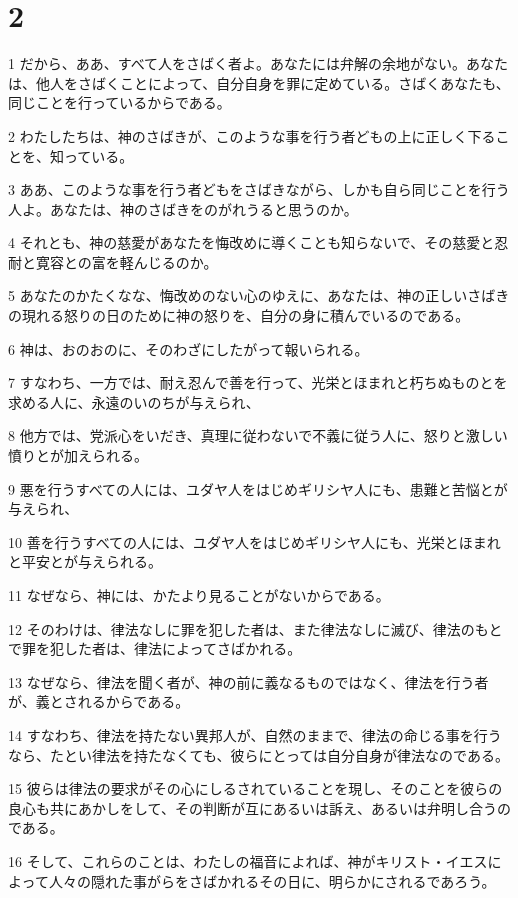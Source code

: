 \chapter{2}

\par 1 だから、ああ、すべて人をさばく者よ。あなたには弁解の余地がない。あなたは、他人をさばくことによって、自分自身を罪に定めている。さばくあなたも、同じことを行っているからである。
\par 2 わたしたちは、神のさばきが、このような事を行う者どもの上に正しく下ることを、知っている。
\par 3 ああ、このような事を行う者どもをさばきながら、しかも自ら同じことを行う人よ。あなたは、神のさばきをのがれうると思うのか。
\par 4 それとも、神の慈愛があなたを悔改めに導くことも知らないで、その慈愛と忍耐と寛容との富を軽んじるのか。
\par 5 あなたのかたくなな、悔改めのない心のゆえに、あなたは、神の正しいさばきの現れる怒りの日のために神の怒りを、自分の身に積んでいるのである。
\par 6 神は、おのおのに、そのわざにしたがって報いられる。
\par 7 すなわち、一方では、耐え忍んで善を行って、光栄とほまれと朽ちぬものとを求める人に、永遠のいのちが与えられ、
\par 8 他方では、党派心をいだき、真理に従わないで不義に従う人に、怒りと激しい憤りとが加えられる。
\par 9 悪を行うすべての人には、ユダヤ人をはじめギリシヤ人にも、患難と苦悩とが与えられ、
\par 10 善を行うすべての人には、ユダヤ人をはじめギリシヤ人にも、光栄とほまれと平安とが与えられる。
\par 11 なぜなら、神には、かたより見ることがないからである。
\par 12 そのわけは、律法なしに罪を犯した者は、また律法なしに滅び、律法のもとで罪を犯した者は、律法によってさばかれる。
\par 13 なぜなら、律法を聞く者が、神の前に義なるものではなく、律法を行う者が、義とされるからである。
\par 14 すなわち、律法を持たない異邦人が、自然のままで、律法の命じる事を行うなら、たとい律法を持たなくても、彼らにとっては自分自身が律法なのである。
\par 15 彼らは律法の要求がその心にしるされていることを現し、そのことを彼らの良心も共にあかしをして、その判断が互にあるいは訴え、あるいは弁明し合うのである。
\par 16 そして、これらのことは、わたしの福音によれば、神がキリスト・イエスによって人々の隠れた事がらをさばかれるその日に、明らかにされるであろう。
